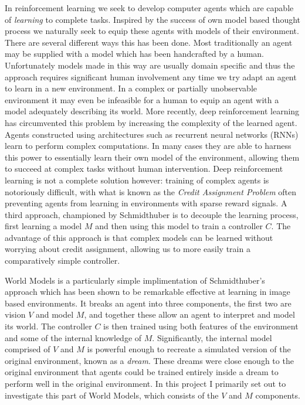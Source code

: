 \documentclass{article}
\theoremstyle{definition}
\begin{document}
In reinforcement learning we seek to develop computer agents which are capable of \textit{learning} to complete tasks.
Inspired by the success of own model based thought process we naturally seek to equip these agents with models of their environment.
There are several different ways this has been done.
Most traditionally an agent may be supplied with a model which has been handcrafted by a human. %
Unfortunately models made in this way are usually domain specific and thus the approach requires significant human involvement any time we try adapt an agent to learn in a new environment.
In a complex or partially unobservable environment it may even be infeasible for a human to equip an agent with a model adequately describing its world. %
More recently, deep reinforcement learning has circumvented this problem by increasing the complexity of the learned agent.
Agents constructed using architectures such as recurrent neural networks (RNNs) learn to perform complex computations.
In many cases they are able to harness this power to essentially learn their own model of the environment, allowing them to succeed at complex tasks without human intervention.
Deep reinforcement learning is not a complete solution however: training of complex agents is notoriously difficult, with what is known as the \textit{Credit Assignment Problem} often preventing agents from learning in environments with sparse reward signals.
A third approach, championed by Schmidthuber is to decouple the learning process, first learning a model $M$ and then using this model to train a controller $C$. %
The advantage of this approach is that complex models can be learned without worrying about credit assignment, allowing us to more easily train a comparatively simple controller.

World Models is a particularly simple implimentation of Schmidthuber's approach which has been shown to be remarkable effective at learning in image based environments. %
It breaks an agent into three components, the first two are vision $V$ and model $M$, and together these allow an agent to interpret and model its world.
The controller $C$ is then trained using both features of the environment and some of the internal knowledge of $M$.
Significantly, the internal model comprised of $V$ and $M$ is powerful enough to recreate a simulated version of the original environment, known as a \textit{dream}.
These dreams were close enough to the original environment that agents could be trained entirely inside a dream to perform well in the original environment.
In this project I primarily set out to investigate this part of World Models, which consists of the $V$ and $M$ components.
\end{document}
